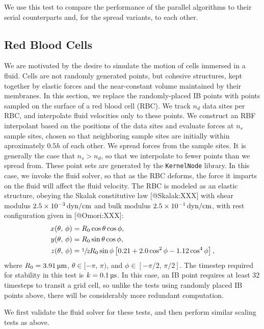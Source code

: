 We use this test to compare the performance of the parallel algorithms to
their serial counterparts and, for the spread variants, to each other.





\subsection{Red Blood Cells}

We are motivated by the desire to simulate the motion of cells immersed in a
fluid. Cells are not randomly generated points, but cohesive structures, kept
together by elastic forces and the near-constant volume maintained by their
membranes. In this section, we replace the randomly-placed IB points with
points sampled on the surface of a red blood cell (RBC). We track $n_d$ data
sites per RBC, and interpolate fluid velocities only to these points. We
construct an RBF interpolant based on the positions of the data sites and
evaluate forces at $n_s$ sample sites, chosen so that neighboring sample sites
are initially within aproximately $0.5h$ of each other. We spread forces from
the sample sites. It is generally the case that $n_s > n_d$, so that we
interpolate to fewer points than we spread from. These point sets are generated
by the \texttt{KernelNode} library. In this case, we invoke the fluid solver,
so that as the RBC deforms, the force it imparts on the fluid will affect the
fluid velocity. The RBC is modeled as an elastic structure, obeying the Skalak
constitutive law [@Skalak:XXX] with shear modulus $2.5\times10^{-3}\dynpercm$
and bulk modulus $2.5\times10^{-1}\dynpercm$, with rest configuration given
in [@Omori:XXX]:
\begin{equation}
    \begin{aligned}
        x(\theta,\,\phi) &= R_0\cos\theta\cos\phi, \\
        y(\theta,\,\phi) &= R_0\sin\theta\cos\phi, \\
        z(\theta,\,\phi) &= \sfrac12 R_0\sin\phi\left[0.21 + 2.0 \cos^2\phi -1.12 \cos^4\phi\right],
    \end{aligned}
\end{equation}
where $R_0=3.91\um$, $\theta\in[-\pi,\,\pi)$, and $\phi\in[-\pi/2,\,\pi/2]$.
The timestep required for stability in this test is $k=0.1\us$. In this case,
an IB point requires at least 32 timesteps to transit a grid cell, so unlike
the tests using randomly placed IB points above, there will be considerably
more redundant computation.

We first validate the fluid solver for these tests, and then perform similar
scaling tests as above.




